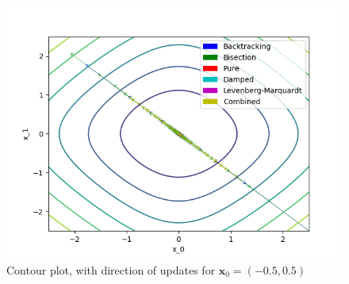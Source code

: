\documentclass[a4paper]{article}
\begin{document}
\begin{figure}[H]
    \centering
    \includegraphics[width=.75\textwidth]{func_1_cont.png}
    \caption{Contour plot, with direction of updates for $\textbf{x}_0 = (-0.5, 0.5)$}
\end{figure}
\end{document}
